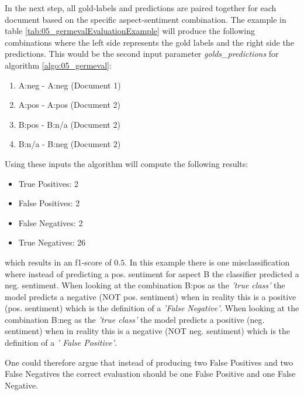 In the next step, all gold-labels and predictions are paired together for each document based on the specific aspect-sentiment combination. The example in table \ref{tab:05_germevalEvaluationExample} will produce the following combinations where the left side represents the gold labels and the right side the predictions. This would be the second input parameter \textit{golds\_predictions} for algorithm \ref{algo:05_germeval}: 

\begin{enumerate}
	\item A:neg - A:neg (Document 1)
	\item A:pos - A:pos (Document 2)
	\item B:pos - B:n/a (Document 2)
	\item B:n/a - B:neg (Document 2)
\end{enumerate}

Using these inputs the algorithm will compute the following results:

\begin{itemize}
	\item True Positives: 2
	\item False Positives: 2
	\item False Negatives: 2
	\item True Negatives: 26
\end{itemize}

which results in an f1-score of $0.5$. In this example there is one misclassification where instead of predicting a pos. sentiment for aspect B the classifier predicted a neg. sentiment. When looking at the combination B:pos as the \textit{'true class'} the model predicts a negative {(NOT pos. sentiment)} when in reality this is a positive {(pos. sentiment)} which is the definition of a \textit{'False Negative'}. When looking at the combination B:neg as the \textit{'true class'} the model predicts a positive {(neg. sentiment)} when in reality this is a negative {(NOT neg. sentiment)} which is the definition of a \textit{' False Positive'}.
\medskip

One could therefore argue that instead of producing two False Positives and two False Negatives the correct evaluation should be one False Positive and one False Negative.


